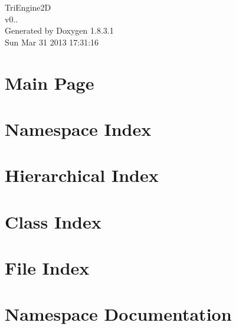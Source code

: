 \documentclass{book}
\begin{document}
\hypersetup{pageanchor=false,citecolor=blue}
\begin{titlepage}
\vspace*{7cm}
\begin{center}
{\Large Tri\-Engine2\-D \\[1ex]\large v0.. }\\
\vspace*{1cm}
{\large Generated by Doxygen 1.8.3.1}\\
\vspace*{0.5cm}
{\small Sun Mar 31 2013 17:31:16}\\
\end{center}
\end{titlepage}
\clearemptydoublepage
{}
\tableofcontents
\clearemptydoublepage
{}
\hypersetup{pageanchor=true,citecolor=blue}
\chapter{Main Page}
\label{index}\hypertarget{index}{}
\chapter{Namespace Index}

\chapter{Hierarchical Index}

\chapter{Class Index}

\chapter{File Index}

\chapter{Namespace Documentation}

















\end{document}

